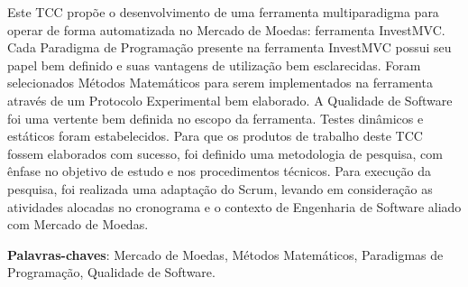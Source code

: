 \begin{resumo}
Este TCC propõe o desenvolvimento de uma ferramenta multiparadigma para operar de forma automatizada no Mercado de Moedas: ferramenta InvestMVC. Cada Paradigma de Programação presente na ferramenta InvestMVC possui seu papel bem definido e suas vantagens de utilização bem esclarecidas. Foram selecionados Métodos Matemáticos para serem implementados na ferramenta através de um Protocolo Experimental bem elaborado. A Qualidade de Software foi uma vertente bem definida no escopo da ferramenta. Testes dinâmicos e estáticos foram estabelecidos. Para que os produtos de trabalho deste TCC fossem elaborados com sucesso, foi definido uma metodologia de pesquisa, com ênfase no objetivo de estudo e nos procedimentos técnicos. Para execução da pesquisa, foi realizada uma adaptação do Scrum, levando em consideração as atividades alocadas no cronograma e o contexto de Engenharia de Software aliado com Mercado de Moedas.

 \vspace{\onelineskip}
    
 \noindent
 \textbf{Palavras-chaves}: Mercado de Moedas, Métodos Matemáticos, Paradigmas de Programação, Qualidade de Software.
\end{resumo}
